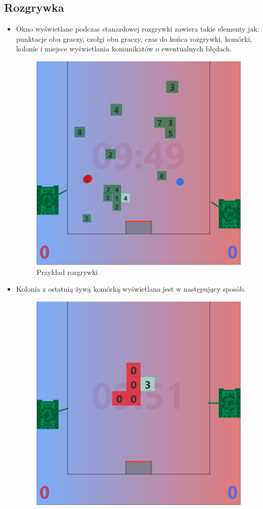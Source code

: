 \documentclass[11pt,a4paper]{report}
\begin{document}
\subsection {Rozgrywka}
\begin{itemize}
\item{}Okno wyświetlane podczas stanardowej rozgrywki zawiera takie elementy jak: punktacje obu graczy, czołgi obu graczy, czas do końca rozgrywki, komórki,  kolonie i miejsce wyświetlania komunikatów o ewentualnych błędach.
\begin{figure}[!ht]
\centerline{\includegraphics{img/rozgrywka1.png}}
\caption{ Przykład rozgrywki }
\end{figure}
\newpage
\item{}Kolonia z ostatnią żywą komórką wyświetlana jest w następujący sposób.
\begin{figure}[!ht]
\centerline{\includegraphics{img/rozgrywka2.png}}

\end{figure}
\end{itemize}
\end{document}
